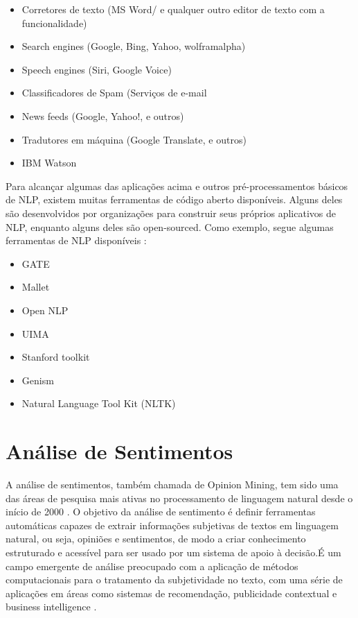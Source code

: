 \documentclass[
	12pt,				%
	openright,			%
	oneside,			%
	a4paper,			%
	english,			%
	spanish,			%
	brazil				%
	]{abntex2}
\begin{document}
	\begin{itemize}
	 	\item Corretores de texto (MS Word/ e qualquer outro editor de texto com a funcionalidade)
	 	\item Search engines (Google, Bing, Yahoo, wolframalpha)
	 	\item Speech engines (Siri, Google Voice)
	 	\item Classificadores de Spam (Serviços de e-mail
	 	\item News feeds (Google, Yahoo!, e outros)
	 	\item Tradutores em máquina (Google Translate, e outros)
	 	\item IBM Watson
	\end{itemize}

Para alcançar algumas das aplicações acima e outros pré-processamentos básicos de NLP, existem muitas ferramentas de código aberto disponíveis. Alguns deles são desenvolvidos por organizações para construir seus próprios aplicativos de NLP, enquanto alguns deles são open-sourced. Como exemplo, segue algumas ferramentas de NLP disponíveis \cite{book_natlang_python}:

	\begin{itemize}
	 	\item GATE
	 	\item Mallet
	 	\item Open NLP
	 	\item UIMA
	 	\item Stanford toolkit
	 	\item Genism
	 	\item Natural Language Tool Kit (NLTK)
	\end{itemize}
	
	\section{Análise de Sentimentos}
		A análise de sentimentos, também chamada de Opinion Mining, tem sido uma das áreas de pesquisa mais ativas no processamento de linguagem natural desde o início de 2000 \cite{bliu_2012}. O objetivo da análise de sentimento é definir ferramentas automáticas capazes de extrair informações subjetivas de textos em linguagem natural, ou seja, opiniões e sentimentos, de modo a criar conhecimento estruturado e acessível para ser usado por um sistema de apoio à decisão.É um campo emergente de análise preocupado com a aplicação de métodos computacionais para o tratamento da subjetividade no texto, com uma série de aplicações em áreas como sistemas de recomendação, publicidade contextual e business intelligence \cite{book_discover_practices}.
\end{document}
